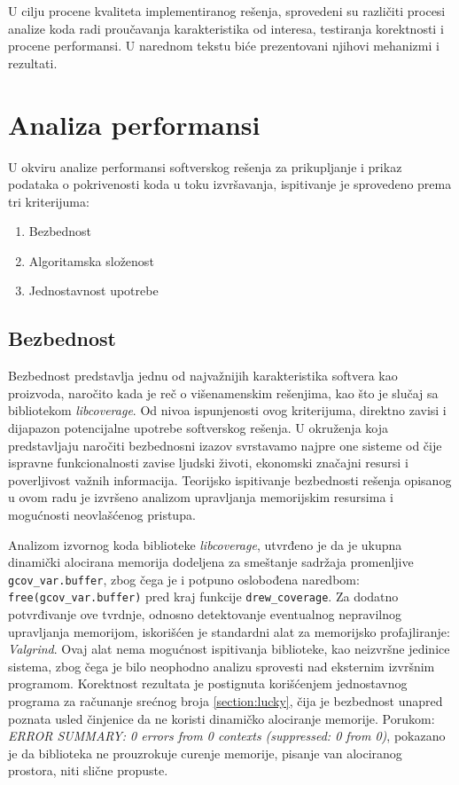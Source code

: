 \documentclass[12pt,oneside]{memoir}
\newcommand{\kod}[1]{\texttt{#1}}
\newcommand{\strano}[1]{\textit{#1}}
\begin{document}
U cilju procene kvaliteta implementiranog rešenja, sprovedeni su različiti procesi analize koda radi proučavanja karakteristika od interesa, testiranja korektnosti i procene performansi. U narednom tekstu biće prezentovani njihovi mehanizmi i rezultati.

\section{Analiza performansi}

U okviru analize performansi softverskog rešenja za prikupljanje i prikaz podataka o pokrivenosti koda u toku izvršavanja, ispitivanje je sprovedeno prema tri kriterijuma:
\begin{enumerate}
\item Bezbednost
\item Algoritamska složenost
\item Jednostavnost upotrebe
\end{enumerate}

\subsection{Bezbednost}

Bezbednost predstavlja jednu od najvažnijih karakteristika softvera kao proizvoda, naročito kada je reč o višenamenskim rešenjima, kao što je slučaj sa bibliotekom \strano{libcoverage}. Od nivoa ispunjenosti ovog kriterijuma, direktno zavisi i dijapazon potencijalne upotrebe softverskog rešenja. U okruženja koja predstavljaju naročiti bezbednosni izazov svrstavamo najpre one sisteme od čije ispravne funkcionalnosti zavise ljudski životi, ekonomski značajni resursi i poverljivost važnih informacija. Teorijsko ispitivanje bezbednosti rešenja opisanog u ovom radu je izvršeno analizom upravljanja memorijskim resursima i mogućnosti neovlašćenog pristupa. 


Analizom izvornog koda biblioteke \strano{libcoverage}, utvrđeno je da je ukupna dinamički alocirana memorija dodeljena za smeštanje sadržaja promenljive \kod{gcov\_var.buffer}, zbog čega je i potpuno oslobođena  naredbom: \kod{free(gcov\_var.buffer)} pred kraj funkcije  \kod{drew\_coverage}. Za dodatno potvrđivanje ove tvrdnje, odnosno detektovanje eventualnog nepravilnog upravljanja memorijom, iskorišćen je standardni alat za memorijsko profajliranje: \strano{Valgrind}. Ovaj alat nema mogućnost ispitivanja biblioteke, kao neizvršne jedinice sistema, zbog čega je bilo neophodno analizu sprovesti nad eksternim izvršnim programom. Korektnost rezultata je postignuta korišćenjem jednostavnog programa za računanje srećnog broja \ref{section:lucky}, čija je bezbednost unapred poznata usled činjenice da ne koristi dinamičko alociranje memorije. Porukom: \strano{ERROR SUMMARY: 0 errors from 0 contexts (suppressed: 0 from 0)}, pokazano je da biblioteka ne prouzrokuje curenje memorije, pisanje van alociranog prostora, niti slične propuste. 
\end{document}

